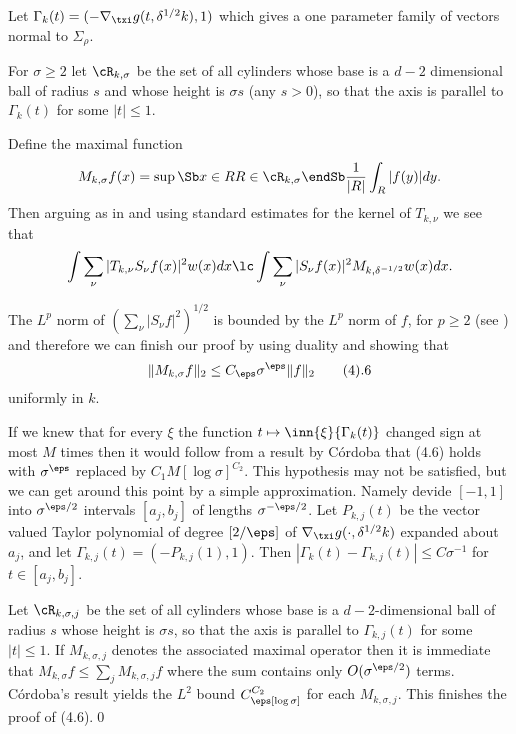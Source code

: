 Let $\Gamma_k(t)=(-\nabla_{\txi}g(t,\delta^{1/2} k), 1)$
which gives a one parameter family of
vectors normal  
to $\Sigma_\rho$.

For $\sigma\ge 2$ let $\cR_{k,\sigma}$ be the set of all cylinders 
 whose base is 
a $d-2$ dimensional ball of radius $s$ and whose height is 
$\sigma s$ (any $s>0$),
so that  the axis is parallel to
$\Gamma_{k}(t)$ for some $|t|\le 1$. 

Define the maximal function 
$$M_{k,\sigma} f(x)=\sup\Sb x\in R\\R\in \cR_{k,\sigma}\endSb \frac 1{|R|}
\int_R |f(y)| dy.
$$
Then arguing as in \cite{6} and 
using standard estimates for the kernel of $T_{k,\nu}$ we see that
$$
\int\sum_\nu|T_{k,\nu} S_\nu f(x)|^2 w(x) dx\lc
\int\sum_\nu|S_\nu f(x)|^2 
M_{k,\delta^{-1/2}} w(x) dx.
$$


The $L^p$ norm of $(\sum_\nu|S_\nu f|^2)^{1/2}$ 
is bounded by the $L^p$ norm of 
$f$, for $p\ge 2$ (see \cite{6})  and therefore   we can finish our proof
by using duality and  showing that
$$
\|M_{k,\sigma} f\|_2\le C_\eps \sigma^{\eps} \|f\|_2
\tag 4.6
$$
uniformly in $k$.




If we knew that for every $\xi$ the function 
$t\mapsto \inn{\xi}{\Gamma_k(t)}$ changed sign at most 
$M$ times then it would follow 
from a result by C\'ordoba \cite{7} that (4.6) holds with 
$\sigma^\eps$ replaced by
$C_1 M [\log \sigma]^{C_2}$. 
This hypothesis  may not be satisfied, but we can get around this point 
by  a simple  approximation. Namely devide $[-1,1]$ into $\sigma^{\eps/2}$ 
intervals $[a_j,b_j]$ of lengths $\sigma^{-\eps/2}$. 
Let $P_{k,j}(t)$ be the
vector valued  
Taylor polynomial of 
degree $[2/\eps]$ of $\nabla_\txi g(\cdot, \delta^{1/2}k)$ 
 expanded about $a_j$, and let $\Gamma_{k,j}(t)=(-P_{k,j}(1),1)$.
Then $|\Gamma_k(t)-\Gamma_{k,j}(t)|\le C\sigma^{-1}$ for $t\in [a_j,b_j]$.



Let $\cR_{k,\sigma,j}$ be the set of all cylinders  whose base is 
a $d-2$-dimensional ball of radius $s$  whose height is 
$\sigma s$,
so that  the axis is parallel to
$\Gamma_{k,j}(t)$ for some $|t|\le 1$.  If $M_{k,\sigma,j}$ denotes the 
associated maximal operator then it is immediate that
$M_{k,\sigma}f\le \sum_j M_{k,\sigma,j}f$  where the sum contains only
$O(\sigma^{\eps/2})$ terms. C\'ordoba's result yields the
$L^2$ bound $C_\eps [\log\sigma]^{C_2}$ for each $M_{k,\sigma,j}$.
This finishes the proof of (4.6).\qed
\enddemo
\enddemo



